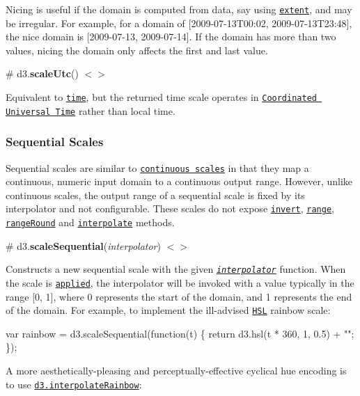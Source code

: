 Nicing is useful if the domain is computed from data, say using \href{https://github.com/d3/d3-array#extent}{\tt extent}, and may be irregular. For example, for a domain of \mbox{[}2009-\/07-\/13\+T00\+:02, 2009-\/07-\/13\+T23\+:48\mbox{]}, the nice domain is \mbox{[}2009-\/07-\/13, 2009-\/07-\/14\mbox{]}. If the domain has more than two values, nicing the domain only affects the first and last value.

\label{_scaleUtc}%
\# d3.{\bfseries scale\+Utc}() \href{https://github.com/d3/d3-scale/blob/master/src/utcTime.js}{\tt $<$$>$}

Equivalent to \href{#time}{\tt time}, but the returned time scale operates in \href{https://en.wikipedia.org/wiki/Coordinated_Universal_Time}{\tt Coordinated Universal Time} rather than local time.

\subsubsection*{Sequential Scales}

Sequential scales are similar to \href{#continuous-scales}{\tt continuous scales} in that they map a continuous, numeric input domain to a continuous output range. However, unlike continuous scales, the output range of a sequential scale is fixed by its interpolator and not configurable. These scales do not expose \href{#continuous_invert}{\tt invert}, \href{#continuous_range}{\tt range}, \href{#continuous_rangeRound}{\tt range\+Round} and \href{#continuous_interpolate}{\tt interpolate} methods.

\label{_scaleSequential}%
\# d3.{\bfseries scale\+Sequential}({\itshape interpolator}) \href{https://github.com/d3/d3-scale/blob/master/src/sequential.js}{\tt $<$$>$}

Constructs a new sequential scale with the given \href{#sequential_interpolator}{\tt {\itshape interpolator}} function. When the scale is \href{#_sequential}{\tt applied}, the interpolator will be invoked with a value typically in the range \mbox{[}0, 1\mbox{]}, where 0 represents the start of the domain, and 1 represents the end of the domain. For example, to implement the ill-\/advised \href{https://github.com/d3/d3-color#hsl}{\tt H\+SL} rainbow scale\+:


\begin{DoxyCode}
var rainbow = d3.scaleSequential(function(t) \{
  return d3.hsl(t * 360, 1, 0.5) + "";
\});
\end{DoxyCode}


A more aesthetically-\/pleasing and perceptually-\/effective cyclical hue encoding is to use \href{#interpolateRainbow}{\tt d3.\+interpolate\+Rainbow}\+:


